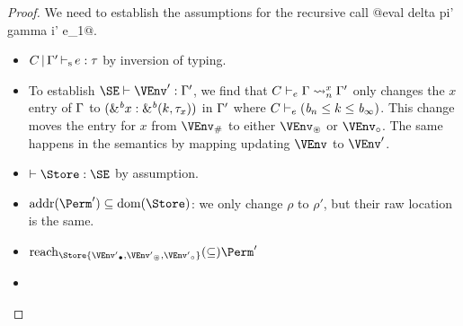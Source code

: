 \begin{proof}
  We need to establish the assumptions for the recursive call
  @eval delta pi' gamma i' e_1@.
  \begin{itemize}
  \item $\inferS{C}{\E'}{e}{\tau}$ by inversion of typing.
  \item To establish $\SE \vdash \VEnv' : \E'$, we find that
    $\lregion{C}{x}{\E}{\E'}$ only changes the $x$ entry of $\E$ to
    ${\bvar{\borrow[\BORROW]{x}}{\borrowty[\BORROW] k{\tau_x}}}$ in
    $\E'$ where $C \vdash_e {(\BORROW_n\lk k\lk\BORROW_\infty)}$. This
    change moves the entry for $x$ from $\Suspended\VEnv$ to either
    $\MutableBorrows\VEnv$ or $\ImmutableBorrows\VEnv$. The same
    happens in the semantics by mapping updating $\VEnv$ to $\VEnv'$. 
  \item $\vdash \Store : \SE$ by assumption.
  \item $\Addresses{\Perm'} \subseteq \Dom\Store$: we only change
    $\rho$ to $\rho'$, but their raw location is the same.
  \item $\Reach\Store{\Active{\VEnv'}, \MutableBorrows{\VEnv'}, \ImmutableBorrows{\VEnv'}} \subseteq \Perm'$
  \item 
  \end{itemize}

\end{proof}
\clearpage
